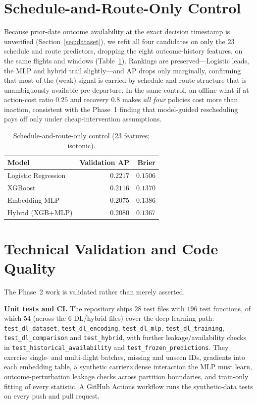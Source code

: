 \documentclass[conference]{IEEEtran}
\newcommand{\code}[1]{\texttt{#1}}
\begin{document}
\section{Schedule-and-Route-Only Control}
\label{sec:control}
Because prior-date outcome availability at the exact decision timestamp is
unverified (Section~\ref{sec:dataset}), we refit all four candidates on only the
$23$ schedule and route predictors, dropping the eight outcome-history features,
on the same flights and windows (Table~\ref{tab:control}). Rankings are
preserved---Logistic leads, the MLP and hybrid trail slightly---and AP drops only
marginally, confirming that most of the (weak) signal is carried by schedule and
route structure that is unambiguously available pre-departure. In the same
control, an offline what-if at action-cost ratio $0.25$ and recovery $0.8$ makes
\emph{all four} policies cost more than inaction, consistent with the Phase~1
finding that model-guided rescheduling pays off only under cheap-intervention
assumptions.

\begin{table}[!t]
  \caption{Schedule-and-route-only control (23 features; isotonic).}
  \label{tab:control}
  \centering
  \begin{tabular}{lrr}
    \toprule
    Model & Validation AP & Brier \\
    \midrule
    Logistic Regression & $0.2217$ & $0.1506$ \\
    XGBoost             & $0.2116$ & $0.1370$ \\
    Embedding MLP       & $0.2075$ & $0.1386$ \\
    Hybrid (XGB$+$MLP)  & $0.2080$ & $0.1367$ \\
    \bottomrule
  \end{tabular}
\end{table}

\section{Technical Validation and Code Quality}
\label{sec:validation}
The Phase~2 work is validated rather than merely asserted.

\textbf{Unit tests and CI.}
The repository ships $28$ test files with $196$ test functions, of which $54$
(across the $6$ DL/hybrid files) cover the deep-learning path:
\code{test\_dl\_dataset}, \code{test\_dl\_encoding}, \code{test\_dl\_mlp},
\code{test\_dl\_training}, \code{test\_dl\_comparison} and \code{test\_hybrid},
with further leakage/availability checks in \code{test\_historical\_availability}
and \code{test\_frozen\_predictions}. They exercise single- and multi-flight
batches, missing and unseen IDs, gradients into each embedding table, a synthetic
carrier$\times$dense interaction the MLP must learn, outcome-perturbation leakage
checks across partition boundaries, and train-only fitting of every statistic. A
GitHub Actions workflow runs the synthetic-data tests on every push and pull
request.
\end{document}
